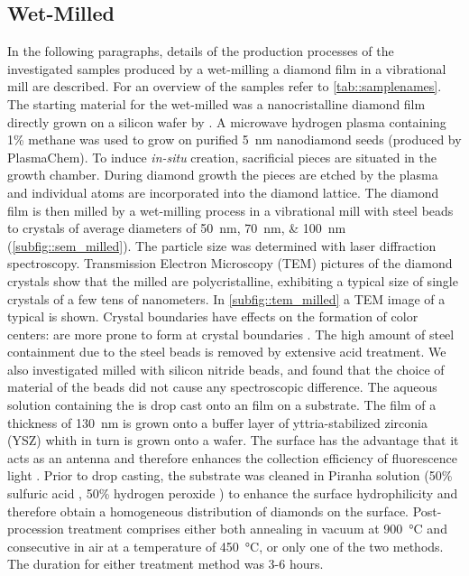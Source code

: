 	\subsection{Wet-Milled \cvd \Nds}\label{subsec::milled_nds}
	In the following paragraphs, details of the production processes of the investigated samples produced by a wet-milling a \CVD diamond film in a vibrational mill are described. 
	For an overview of the samples refer to \autoref{tab::samplenames}.
	The starting material for the wet-milled \nds was a nanocristalline diamond film \cite{Williams2006a} directly grown on a silicon wafer by \CVD. 
	A microwave hydrogen plasma containing 1\% methane was used to grow on purified \SI{5}{\nano\meter} nanodiamond seeds (produced by PlasmaChem).
	To induce \textit{in-situ} \siv creation, sacrificial \Si pieces are situated in the growth chamber.
	During diamond growth the \Si pieces are etched by the plasma and individual atoms are incorporated into the diamond lattice.
	The diamond film is then milled by a wet-milling process in a vibrational mill with steel beads to crystals of average diameters of \SIlist{50; 70; 100}{\nano\meter} (\autoref{subfig::sem_milled}).
	The particle size was determined with laser diffraction spectroscopy.
	Transmission Electron Microscopy (TEM) pictures of the diamond crystals show that the milled \nds are polycristalline, exhibiting a typical size of single crystals of a few tens of nanometers.
	In \autoref{subfig::tem_milled} a TEM image of a typical \nd is shown.
	Crystal boundaries have effects on the formation of color centers:
	\sivs are more prone to form at crystal boundaries \cite{Zapol2001}.
	The high amount of steel containment due to the steel beads is removed by extensive acid treatment.
	We also investigated \nds milled with silicon nitride beads, and found that the choice of material of the beads did not cause any spectroscopic difference.
	The aqueous solution containing the \nds is drop cast onto an \ir film on a \Si substrate.
	The \ir film of a thickness of \SI{130}{nm} is grown onto a buffer layer of yttria-stabilized zirconia (YSZ) whith in turn is grown onto a \Si wafer.
	The \ir surface has the advantage that it acts as an antenna and therefore enhances the collection efficiency of fluorescence light \cite{Neu2012a}.
	Prior to drop casting, the substrate was cleaned in Piranha solution (50\% sulfuric acid , 50\% hydrogen peroxide ) to enhance the surface hydrophilicity and therefore obtain a homogeneous distribution of diamonds on the surface.
	Post-procession treatment comprises either both annealing in vacuum at \SI{900}{\degreeCelsius} and consecutive \ox in air at a temperature of \SI{450}{\degreeCelsius}, or only one of the two methods.
	The duration for either treatment method was 3-6 hours.
	\\
